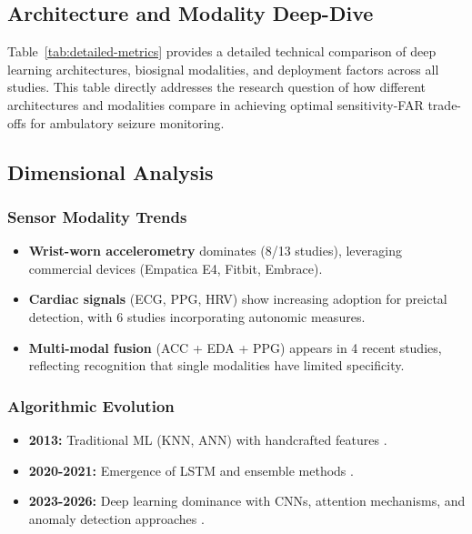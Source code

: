 \subsection{Architecture and Modality Deep-Dive}

Table~\ref{tab:detailed-metrics} provides a detailed technical comparison of deep learning architectures, biosignal modalities, and deployment factors across all studies. This table directly addresses the research question of how different architectures and modalities compare in achieving optimal sensitivity-FAR trade-offs for ambulatory seizure monitoring.

\subsection{Dimensional Analysis}

\subsubsection{Sensor Modality Trends}
\begin{itemize}
  \item \textbf{Wrist-worn accelerometry} dominates (8/13 studies), leveraging commercial devices (Empatica E4, Fitbit, Embrace).
  \item \textbf{Cardiac signals} (ECG, PPG, HRV) show increasing adoption for preictal detection, with 6 studies incorporating autonomic measures.
  \item \textbf{Multi-modal fusion} (ACC + EDA + PPG) appears in 4 recent studies, reflecting recognition that single modalities have limited specificity.
\end{itemize}

\subsubsection{Algorithmic Evolution}
\begin{itemize}
  \item \textbf{2013:} Traditional ML (KNN, ANN) with handcrafted features \parencite{borujenyDetectionEpilepticSeizure2013}.
  \item \textbf{2020-2021:} Emergence of LSTM and ensemble methods \parencite{meiselMachineLearningWristband2020,stirlingForecastingSeizureLikelihood2021}.
  \item \textbf{2023-2026:} Deep learning dominance with CNNs, attention mechanisms, and anomaly detection approaches \parencite{reintjesECGBasedDetectionEpileptic2025,odeDevelopmentEpilepticSeizure2023,spahrDeepLearningbasedDetection2025}.
\end{itemize}

